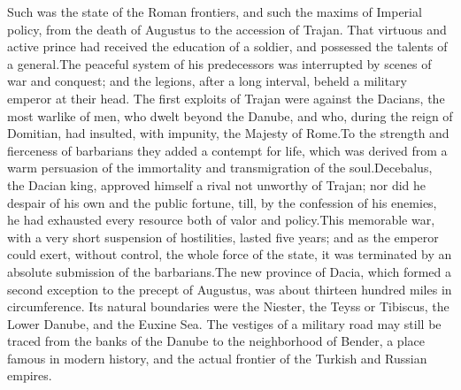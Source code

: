 

Such was the state of the Roman frontiers, and such the maxims of
Imperial policy, from the death of Augustus to the accession of
Trajan. That virtuous and active prince had received the
education of a soldier, and possessed the talents of a general.\footnotemark[13]
The peaceful system of his predecessors was interrupted by
scenes of war and conquest; and the legions, after a long
interval, beheld a military emperor at their head. The first
exploits of Trajan were against the Dacians, the most warlike of
men, who dwelt beyond the Danube, and who, during the reign of
Domitian, had insulted, with impunity, the Majesty of Rome.\footnotemark[14] To
the strength and fierceness of barbarians they added a contempt
for life, which was derived from a warm persuasion of the
immortality and transmigration of the soul.\footnotemark[15] Decebalus, the
Dacian king, approved himself a rival not unworthy of Trajan; nor
did he despair of his own and the public fortune, till, by the
confession of his enemies, he had exhausted every resource both
of valor and policy.\footnotemark[16] This memorable war, with a very short
suspension of hostilities, lasted five years; and as the emperor
could exert, without control, the whole force of the state, it
was terminated by an absolute submission of the barbarians.\footnotemark[17]
The new province of Dacia, which formed a second exception to the
precept of Augustus, was about thirteen hundred miles in
circumference. Its natural boundaries were the Niester, the Teyss
or Tibiscus, the Lower Danube, and the Euxine Sea. The vestiges
of a military road may still be traced from the banks of the
Danube to the neighborhood of Bender, a place famous in modern
history, and the actual frontier of the Turkish and Russian
empires.\footnotemark[18]



